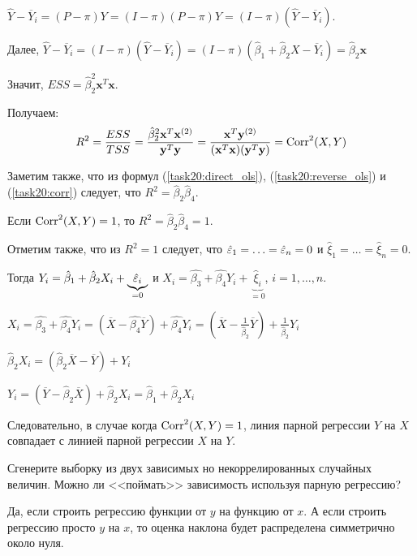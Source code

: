 \documentclass[pdftex,11pt,openany]{book}
\begin{document}
\begin{solution}
$\hat{Y} - \overline{Y}_i = (P - \pi)Y = (I - \pi)(P - \pi)Y = (I-\pi)(\hat{Y} - \overline{Y}_i)$.

Далее, $\hat{Y} - \overline{Y}_i = (I - \pi)(\hat{Y} - \overline{Y}_i) = (I - \pi)(\hat{\beta}_1 + \hat{\beta}_2 X - \overline{Y}_i) = \hat{\beta}_2 \textbf{x}$

Значит, $ESS = \hat{\beta}_2^2 \textbf{x}^T \textbf{x}$.

Получаем:
\begin{equation}
\label{task20:corr}R^2 = \frac{ESS}{TSS} = \frac{\hat{\beta}_2^2 \textbf{x}^T \textbf{x}^{(2)}}{\textbf{y}^T \textbf{y}} = \frac{\textbf{x}^T \textbf{y}^{(2)}}{(\textbf{x}^T \textbf{x})(\textbf{y}^T \textbf{y})} = \operatorname{Corr}^2(X, Y)
\end{equation}

Заметим также, что из формул (\ref{task20:direct_ols}), (\ref{task20:reverse_ols}) и (\ref{task20:corr}) следует, что $R^2 = \hat{\beta}_2 \hat{\beta}_4$.

Если $\operatorname{Corr}^2(X, Y) = 1$, то $R^2 = \hat{\beta}_2 \hat{\beta}_4 = 1$.

Отметим также, что из $R^2 = 1$ следует, что $\hat{\varepsilon}_1 = \ldots = \hat{\varepsilon}_n = 0$ и $\hat{\xi}_1 = \ldots = \hat{\xi}_n = 0$.

Тогда $Y_i = \hat{\beta}_1 + \hat{\beta}_2 X_i + \underbrace{\hat{\varepsilon}_i}_{=0}$ и $X_i = \hat{\beta_3} + \hat{\beta_4} Y_i + \underbrace{\hat{\xi}_i}_{=0}$, $i = 1, \ldots, n$.

$X_i = \hat{\beta_3} + \hat{\beta_4} Y_i = (\overline{X} - \hat{\beta_4}\overline{Y}) + \hat{\beta_4} Y_i = \left( \overline{X} - \frac{1}{\hat{\beta}_2} \overline{Y} \right) + \frac{1}{\hat{\beta}_2} Y_i$

$\hat{\beta}_2 X_i = (\hat{\beta}_2 \overline{X} - \overline{Y}) + Y_i$

$Y_i = (\overline{Y} - \hat{\beta}_2 \overline{X}) + \hat{\beta}_2 X_i = \hat{\beta}_1 + \hat{\beta}_2 X_i$

Следовательно, в случае когда $\operatorname{Corr}^2(X, Y) = 1$, линия парной регрессии $Y$ на $X$ совпадает с линией парной регрессии $X$ на $Y$.
\end{solution}



\begin{problem}
Сгенерите выборку из двух зависимых но некоррелированных случайных величин. Можно ли <<поймать>> зависимость используя парную регрессию?
\end{problem}

\begin{solution}
Да, если строить регрессию функции от $y$ на функцию от $x$. А если строить регрессию просто $y$ на $x$, то оценка наклона будет распределена симметрично около нуля.
\end{solution}
\end{document}
